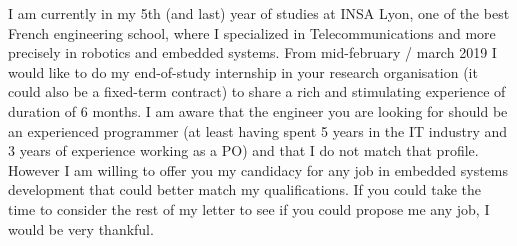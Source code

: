 \documentclass[11pt, a4paper]{awesome-cv}
\begin{document}
\makecvheader[R]


\makelettertitle

\begin{cvletter}

I am currently in my 5th (and last) year of studies at INSA Lyon, one of the best French engineering school, where I specialized in Telecommunications and more precisely in robotics and embedded systems. From mid-february / march 2019 I would like to do my end-of-study internship in your research organisation (it could also be a fixed-term contract) to share a rich and stimulating experience of duration of 6 months. I am aware that the engineer you are looking for should be an experienced programmer (at least having spent 5 years in the IT industry and 3 years of experience working as a PO) and that I do not match that profile. However I am willing to offer you my candidacy for any job in embedded systems development that could better match my qualifications. If you could take the time to consider the rest of my letter to see if you could propose me any job, I would be very thankful. 

\vspace{1mm} %




\end{cvletter}
\end{document}
